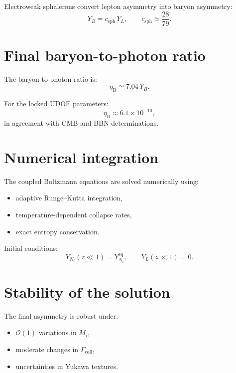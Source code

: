 \documentclass[11pt]{book}
\newcommand{\etaB}{\eta_{\mathrm{B}}}
\begin{document}
Electroweak sphalerons convert lepton asymmetry into baryon asymmetry:
\begin{equation}
Y_B = c_{\mathrm{sph}}\,Y_L,
\qquad
c_{\mathrm{sph}} \simeq \frac{28}{79}.
\end{equation}

\section{Final baryon-to-photon ratio}

The baryon-to-photon ratio is:
\begin{equation}
\etaB \simeq 7.04\,Y_B.
\end{equation}

For the locked UDOF parameters:
\begin{equation}
\etaB \approx 6.1\times10^{-10},
\end{equation}
in agreement with CMB and BBN determinations.

\section{Numerical integration}

The coupled Boltzmann equations are solved numerically using:
\begin{itemize}
\item adaptive Runge--Kutta integration,
\item temperature-dependent collapse rates,
\item exact entropy conservation.
\end{itemize}

Initial conditions:
\begin{equation}
Y_{N_i}(z \ll 1) = Y_{N_i}^{\mathrm{eq}},
\qquad
Y_L(z \ll 1) = 0.
\end{equation}

\section{Stability of the solution}

The final asymmetry is robust under:
\begin{itemize}
\item $\mathcal{O}(1)$ variations in $M_i$,
\item moderate changes in $\Gamma_{\mathrm{coll}}$,
\item uncertainties in Yukawa textures.
\end{itemize}
\end{document}
